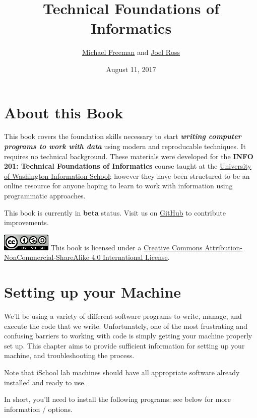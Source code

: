 \documentclass[]{book}
\title{Technical Foundations of Informatics}
\author{\href{http://mfviz.com/\#/}{Michael Freeman} and
\href{http://faculty.washington.edu/joelross/}{Joel Ross}}
\date{August 11, 2017}
\theoremstyle{definition}
\theoremstyle{definition}
\theoremstyle{remark}
\begin{document}
\maketitle

{
\setcounter{tocdepth}{2}
\tableofcontents
}
\chapter*{About this Book}\label{about-this-book}


This book covers the foundation skills necessary to start
\textbf{\emph{writing computer programs to work with data}} using modern
and reproducable techniques. It requires no technical background. These
materials were developed for the \textbf{INFO 201: Technical Foundations
of Informatics} course taught at the
\href{https://ischool.uw.edu/}{University of Washington Information
School}; however they have been structured to be an online resource for
anyone hoping to learn to work with information using programmatic
approaches.

This book is currently in \textbf{beta} status. Visit us on
\href{https://github.com/info201/book}{GitHub} to contribute
improvements.

\includegraphics{img/index/by-nc-sa.png} This book is licensed under a
\href{http://creativecommons.org/licenses/by-nc-sa/4.0/}{Creative
Commons Attribution-NonCommercial-ShareAlike 4.0 International License}.

\hypertarget{setup-machine}{\chapter{Setting up your
Machine}\label{setup-machine}}

We'll be using a variety of different software programs to write,
manage, and execute the code that we write. Unfortunately, one of the
most frustrating and confusing barriers to working with code is simply
getting your machine properly set up. This chapter aims to provide
sufficient information for setting up your machine, and troubleshooting
the process.

Note that iSchool lab machines should have all appropriate software
already installed and ready to use.

In short, you'll need to install the following programs: see below for
more information / options.
\end{document}
